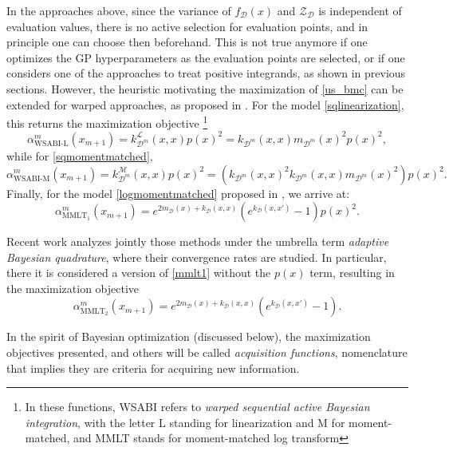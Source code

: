 In the approaches above, since the variance of $f_\mathcal{D}(x)$ and $\mathcal{Z}_\mathcal{D}$ is independent of evaluation values, there is no active selection for evaluation points, and in principle one can choose then beforehand. This is not true anymore if one optimizes the GP hyperparameters as the evaluation points are selected, or if one considers one of the approaches to treat positive integrands, as shown in previous sections. However, the heuristic motivating the maximization of \eqref{us_bmc} can be extended for warped approaches, as proposed in \cite{Gunter_2014}. For the model \eqref{sqlinearization}, this returns the maximization objective \footnote{In these functions, WSABI refers to \textit{warped sequential active Bayesian integration}, with the letter L standing for linearization and M for moment-matched, and MMLT stands for moment-matched log transform}
\begin{equation}
 \alpha^m_{\text{WSABI-L}}(x_{m+1}) = k_{\mathcal{D}^m}^\mathcal{L}(x,x) p(x)^2 = k_{\mathcal{D}^m}(x,x) m_{\mathcal{D}^m}(x)^2 p(x)^2,
\end{equation}
while for \eqref{sqmomentmatched},
\begin{equation}
\alpha^m_{\text{WSABI-M}}(x_{m+1}) = k_{\mathcal{D}^m}^\mathcal{M}(x,x) p(x)^2 = \left(k_{\mathcal{D}^m}(x,x)^2 k_{\mathcal{D}^m}(x,x) m_{\mathcal{D}^m}(x)^2\right) p(x)^2.
\end{equation}
Finally, for the model \eqref{logmomentmatched} proposed in \cite{Chai_2019}, we arrive at:
\begin{equation}\label{mmlt1}
\alpha^m_{\text{MMLT}_1}(x_{m+1}) = e^{2 m_\mathcal{D}(x) + k_\mathcal{D}(x,x)} \left(e^{k_\mathcal{D}(x,x')}-1\right)p(x)^2.
\end{equation}

Recent work \cite{Kanagawa_2019} analyzes jointly those methods under the umbrella term \textit{adaptive Bayesian quadrature}, where their convergence rates are studied. In particular, there it is considered a version of \eqref{mmlt1} without the $p(x)$ term, resulting in the maximization objective
\begin{equation}\label{mmlt2}
\alpha^m_{\text{MMLT}_2}(x_{m+1}) = e^{2 m_\mathcal{D}(x) + k_\mathcal{D}(x,x)} \left(e^{k_\mathcal{D}(x,x')}-1\right).
\end{equation}

In the spirit of Bayesian optimization (discussed below), the maximization objectives presented, and others will be called \textit{acquisition functions}, nomenclature that implies they are criteria for acquiring new information.


